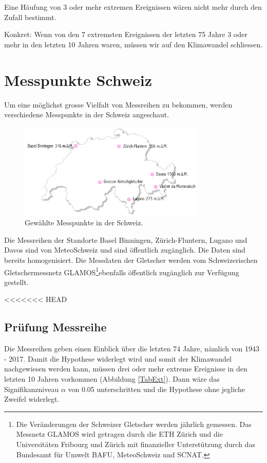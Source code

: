 \begin{refsection}
Eine Häufung von 3 oder mehr extremen Ereignissen wären nicht mehr durch den Zufall bestimmt. 

Konkret: Wenn von den 7 extremsten Ereignissen der letzten 75 Jahre 3 oder mehr in den letzten 10 Jahren waren, müssen wir auf den Klimawandel schliessen.


\section{Messpunkte Schweiz} \label{Beispiele}
Um eine möglichst grosse Vielfalt von Messreihen zu bekommen, werden verschiedene Messpunkte in der Schweiz angeschaut. 

\begin{figure}[htbp]
\centering
\includegraphics[width=0.8\textwidth]{extrem/Schweiz.pdf}
\caption{Gewählte Messpunkte in der Schweiz.}
\label{MesspunkteSchweiz}
\end{figure}

Die Messreihen der Standorte Basel Binningen, Zürich-Fluntern, Lugano und Davos sind von MeteoSchweiz und sind öffentlich zugänglich. Die Daten sind bereits homogenisiert.
Die Messdaten der Gletscher werden vom Schweizerischen Gletschermessnetz GLAMOS\footnote{%
Die Veränderungen der Schweizer Gletscher werden jährlich gemessen. Das Messnetz GLAMOS wird getragen durch die ETH Zürich und die Universitäten Fribourg und Zürich mit finanzieller Unterstützung durch das Bundesamt für Umwelt BAFU, MeteoSchweiz und SCNAT.}ebenfalls öffentlich zugänglich zur Verfügung gestellt.

<<<<<<< HEAD
\subsection{Prüfung Messreihe}
Die Messreihen geben einen Einblick über die letzten 74 Jahre, nämlich von 1943 - 2017. Damit die Hypothese widerlegt wird und somit der Klimawandel nachgewiesen werden kann, müssen drei oder mehr extreme Ereignisse in den letzten 10 Jahren vorkommen (Abbildung \ref{TabExt}). Dann wäre das Signifikanzniveau $\alpha$ von 0.05 unterschritten und die Hypothese ohne jegliche Zweifel widerlegt.



\end{refsection}
